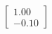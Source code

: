 \documentclass[preview]{standalone}
\begin{document}
\begin{align*}
\begin{bmatrix} 1.00 \\ -0.10 \end{bmatrix}
\end{align*}
\end{document}
